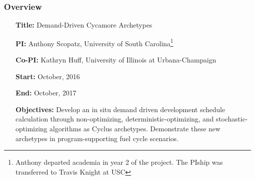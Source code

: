 \begin{frame}
        \frametitle{Overview}
        \begin{itemize}
                  \setlength{\itemindent}{1cm}
                \item[\textbf{Title:}] Demand-Driven Cycamore Archetypes 
                \item[\textbf{PI:}] Anthony Scopatz, University of South 
                        Carolina\footnote{Anthony departed academia in year 2 
                        of the project. The PIship was transferred to Travis 
                        Knight at USC}
                \item[\textbf{Co-PI:}] Kathryn Huff, University of Illinois at 
                        Urbana-Champaign
                \item[\textbf{Start:}] October, 2016
                \item[\textbf{End:}] October, 2017
                \item[\textbf{Objectives:}] Develop an in situ demand 
                        driven development schedule calculation through 
                        non-optimizing, deterministic-optimizing, and 
                        stochastic-optimizing algorithms as Cyclus archetypes. 
                        Demonstrate these new archetypes in program-supporting 
                        fuel cycle scenarios.
        \end{itemize}
\end{frame}


